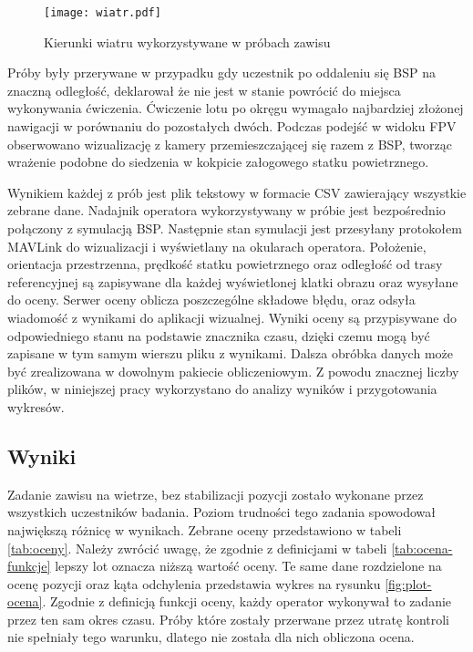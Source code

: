 \begin{figure}[!h]
    \centering \texttt{[image: wiatr.pdf]}
    \caption{Kierunki wiatru wykorzystywane w próbach zawisu}
    \label{fig:wiatr}
\end{figure}

Próby były przerywane w przypadku gdy uczestnik po oddaleniu się BSP na znaczną odległość, deklarował że nie jest w stanie powrócić do miejsca wykonywania ćwiczenia. Ćwiczenie lotu po okręgu wymagało najbardziej złożonej nawigacji w porównaniu do pozostałych dwóch. Podczas podejść w widoku FPV obserwowano wizualizację z kamery przemieszczającej się razem z BSP, tworząc wrażenie podobne do siedzenia w kokpicie załogowego statku powietrznego.

Wynikiem każdej z prób jest plik tekstowy w formacie CSV zawierający wszystkie zebrane dane. Nadajnik operatora wykorzystywany w próbie jest bezpośrednio połączony z symulacją BSP. Następnie stan symulacji jest przesyłany protokołem MAVLink do wizualizacji i wyświetlany na okularach operatora. Położenie, orientacja przestrzenna, prędkość statku powietrznego oraz odległość od trasy referencyjnej są zapisywane dla każdej wyświetlonej klatki obrazu oraz wysyłane do oceny. Serwer oceny oblicza poszczególne składowe błędu, oraz odsyła wiadomość z wynikami do aplikacji wizualnej. Wyniki oceny są przypisywane do odpowiedniego stanu na podstawie znacznika czasu, dzięki czemu mogą być zapisane w tym samym wierszu pliku z wynikami. Dalsza obróbka danych może być zrealizowana w dowolnym pakiecie obliczeniowym. Z powodu znacznej liczby plików, w niniejszej pracy wykorzystano \cite{soft:pandas} do analizy wyników i przygotowania wykresów.

\subsection{Wyniki}
Zadanie zawisu na wietrze, bez stabilizacji pozycji zostało wykonane przez wszystkich uczestników badania. Poziom trudności tego zadania spowodował największą różnicę w wynikach. Zebrane oceny przedstawiono w tabeli \ref{tab:oceny}. Należy zwrócić uwagę, że zgodnie z definicjami w tabeli \ref{tab:ocena-funkcje} lepszy lot oznacza niższą wartość oceny. Te same dane rozdzielone na ocenę pozycji oraz kąta odchylenia przedstawia wykres na rysunku \ref{fig:plot-ocena}. Zgodnie z definicją funkcji oceny, każdy operator wykonywał to zadanie przez ten sam okres czasu. Próby które zostały przerwane przez utratę kontroli nie spełniały tego warunku, dlatego nie została dla nich obliczona ocena.

